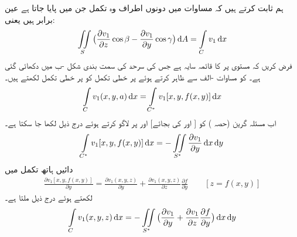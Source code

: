 ہم ثابت کرتے ہیں کہ مساوات  میں دونوں اطراف وہ تکمل جن میں  پایا جاتا ہے عین برابر ہیں یعنی:
\begin{align}\label{مساوات_خطی_تکمل_سٹوکس_ٹ}
\iint\limits_S \big(\frac{\partial v_1}{\partial z}\cos \beta-\frac{\partial v_1}{\partial y}\cos \gamma\big)\dif A=\int\limits_C v_1\dif x
\end{align}
فرض کریں کہ  مستوی پر  کا قائمہ سایہ  ہے جس کی سرحد   کی سمت بندی  شکل -ب میں دکھائی گئی ہے۔ کو مساوات -الف سے ظاہر کرتے ہوئے  پر خطی تکمل کو  پر خطی تکمل لکھتے ہیں۔
\begin{align*}
\int\limits_C v_1(x,y,a)\dif x=\int\limits_{C^*}v_1[x,y,f(x,y)]\dif x
\end{align*}
اب مسئلہ گرین (حصہ ) کو [ اور  کی بجائے]  اور  پر لاگو کرتے ہوئے درج ذیل لکھا جا سکتا ہے۔
\begin{align*}
\int\limits_{C^*}v_1[x,y,f(x,y)]\dif x=-\iint\limits_{S^*}\frac{\partial v_1}{\partial y}\dif x\dif y
\end{align*}
دائیں ہاتھ تکمل میں
\begin{align*}
\frac{\partial v_1[x,y,f(x,y)]}{\partial y}=\frac{\partial v_1(x,y,z)}{\partial y}+\frac{\partial v_1(x,y,z)}{\partial z}\frac{\partial f}{\partial y}\quad\quad [z=f(x,y)]
\end{align*}
لکھتے ہوئے درج ذیل ملتا ہے۔
\begin{align}\label{مساوات_خطی_تکمل_سٹوکس_ث}
\int\limits_C v_1(x,y,z)\dif x=-\iint\limits_{S^*}\big(\frac{\partial v _1}{\partial y}+\frac{\partial v_1}{\partial z}\frac{\partial f}{\partial y}\big)\dif x\dif y
\end{align}

